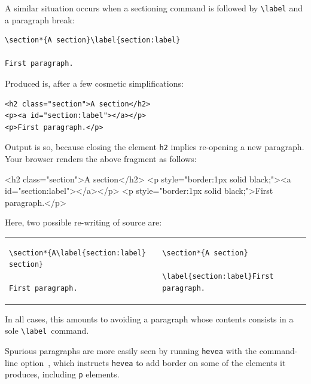 A similar situation occurs when a sectioning command is followed by
\verb+\label+ and a paragraph break:
\begin{verbatim}
\section*{A section}\label{section:label}

First paragraph. 
\end{verbatim}
Produced \html{} is, after a few cosmetic simplifications:
\begin{verbatim}
<h2 class="section">A section</h2>
<p><a id="section:label"></a></p>
<p>First paragraph.</p>
\end{verbatim}
Output is so, because closing the element \verb+h2+ implies re-opening
a new paragraph.
\ifhevea Your browser renders the above \html{} fragment as follows:
\begin{htmlout}%
\begin{rawhtml}
<h2 class="section">A section</h2>
<p style="border:1px solid black;"><a id="section:label"></a></p>
<p style="border:1px solid black;">First paragraph.</p>
\end{rawhtml}%
\end{htmlout}%
\fi
Here, two possible re-writing of source are:
\begin{center}
\begin{tabular}{p{.45\linewidth}p{.45\linewidth}}
\begin{verbatim}
\section*{A\label{section:label} section}

First paragraph.
\end{verbatim}
&
\begin{verbatim}
\section*{A section}

\label{section:label}First paragraph.
\end{verbatim}
\end{tabular}
\end{center}
In all cases, this amounts to avoiding a paragraph whose contents
consists in a sole \verb+\label+~command.

Spurious paragraphs are more easily seen by running \texttt{hevea}
with the command-line option~, which instructs
\texttt{hevea} to add border on some of the elements it produces,
including \verb+p+ elements.

